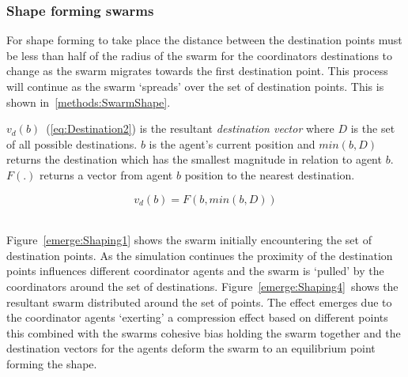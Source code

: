 \subsubsection{Shape forming swarms}\label{sec:DirectionalShape3}
For shape forming to take place the distance between the destination points must be less than half of the radius of the swarm for the coordinators destinations to change as the swarm migrates towards the first destination point. This process will continue as the swarm `spreads' over the set of destination points. This is shown in~\autoref{methods:SwarmShape}.

$v_d(b)$~(\autoref{eq:Destination2}) is the resultant \textit{destination vector} where $D$ is the set of all possible destinations. $b$ is the agent's current position and $min(b,D)$ returns the destination which has the smallest magnitude in relation to agent $b$. $F(.)$ returns a vector from agent $b$ position to the nearest destination.

\begin{center}
\begin{equation}\label{eq:Destination2}‎
v_{d}(b) =‎ F(b,min(b,D))
\end{equation}‎
\end{center}

Figure~\autoref{emerge:Shaping1} shows the swarm initially encountering the set of destination points. As the simulation continues the proximity of the destination points influences different coordinator agents and the swarm is `pulled' by the coordinators around the set of destinations. Figure~\autoref{emerge:Shaping4}~shows the resultant swarm distributed around the set of points. The effect emerges due to the coordinator agents `exerting' a compression effect based on different points this combined with the swarms cohesive bias holding the swarm together and the destination vectors for the agents deform the swarm to an equilibrium point forming the shape.


